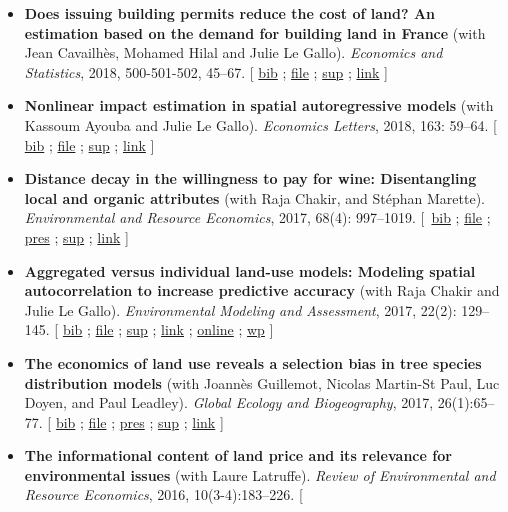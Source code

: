 \documentclass[11pt, a4paper]{./style}
\begin{document}
\begin{itemize}
\item \textbf{Does issuing building permits reduce the cost of land? An
estimation based on the demand for building land in France} (with
Jean Cavailhès, Mohamed Hilal and Julie Le Gallo). \emph{Economics and
Statistics}, 2018, 500-501-502, 45--67.  [ \href{bib/PCPX.bib}{bib} ; \href{doc/PCPX-FILE.pdf}{file} ; \href{doc/PCPX-SUP.pdf}{sup} ;
\href{https://insee.fr/en/statistiques/3621981?sommaire=3622133}{link} ]
\item \textbf{Nonlinear impact estimation in spatial autoregressive models}
(with Kassoum Ayouba and Julie Le Gallo). \emph{Economics Letters},
2018, 163: 59--64. [ \href{bib/NLSP.bib}{bib} ; \href{doc/NLSP-FILE.pdf}{file} ; \href{doc/NLSP-SUP.pdf}{sup} ; \href{https://www.sciencedirect.com/science/article/pii/S0165176517304846}{link} ]
\item \textbf{Distance decay in the willingness to pay for wine: Disentangling
local and organic attributes} (with Raja Chakir, and Stéphan
Marette). \emph{Environmental and Resource Economics}, 2017, 68(4):
997--1019. [~\href{bib/DWTP.bib}{bib} ; \href{doc/DWTP-FILE.pdf}{file} ; \href{doc/DWTP-PRES.pdf}{pres} ; \href{doc/DWTP-SUP.pdf}{sup} ; \href{https://link.springer.com/article/10.1007/s10640-016-0057-8}{link} ]
\item \textbf{Aggregated versus individual land-use models: Modeling spatial
autocorrelation to increase predictive accuracy} (with Raja
Chakir and Julie Le Gallo). \emph{Environmental Modeling and
Assessment}, 2017, 22(2): 129--145. [ \href{bib/LUMP.bib}{bib} ; \href{doc/LUMP-FILE.pdf}{file} ; \href{doc/LUMP-SUP.pdf}{sup} ; \href{https://link.springer.com/article/10.1007/s10666-016-9523-5}{link} ;
\href{https://github.com/jsay/spatial-pred-R}{online} ;  \href{https://www6.versailles-grignon.inra.fr/economie\_publique/Media/fichiers/Working-Papers/Working-Papers-2014/WP\_2014\_02}{wp} ]
\item \textbf{The economics of land use reveals a selection bias in tree
species distribution models} (with Joannès Guillemot, Nicolas
Martin-St Paul, Luc Doyen, and Paul Leadley). \emph{Global Ecology and
Biogeography}, 2017, 26(1):65--77. [ \href{bib/NTSDM.bib}{bib} ; \href{doc/NTSDM-FILE.pdf}{file} ; \href{doc/NTSDM-PRES.pdf}{pres} ; \href{doc/NTSDM-SUP.pdf}{sup} ;
\href{https://onlinelibrary.wiley.com/doi/abs/10.1111/geb.12514}{link} ]
\item \textbf{The informational content of land price and its relevance for
environmental issues} (with Laure Latruffe). \emph{Review of
Environmental and Resource Economics}, 2016, 10(3-4):183--226. [

\end{itemize}
\end{document}
